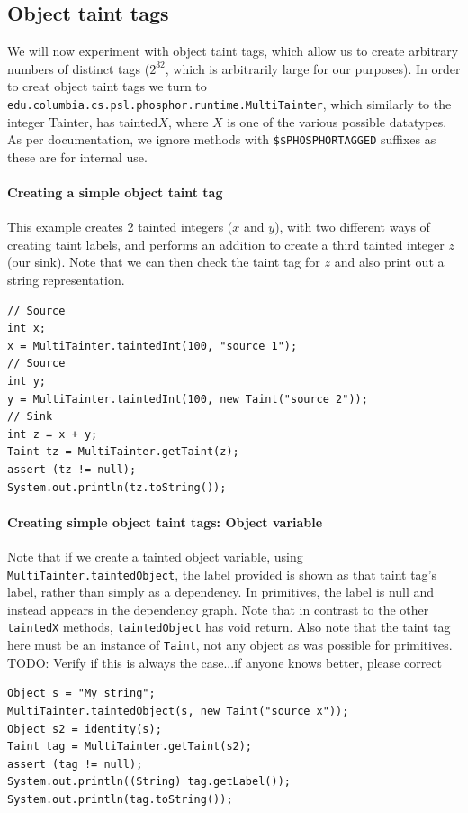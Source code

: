 \documentclass[a4paper]{article}
\newcommand{\todo}[1]{{\color{red}TODO: #1\\}}
\begin{document}
\subsection{Object taint tags}
\label{sec:multitaint}
We will now experiment with object taint tags, which allow us to create arbitrary numbers of distinct tags ($2^{32}$, which is arbitrarily large for our purposes). In order to creat object taint tags we turn to 
\verb|edu.columbia.cs.psl.phosphor.runtime.MultiTainter|, which similarly to the integer Tainter, has tainted$X$, where
$X$ is one of the various possible datatypes. As per documentation, we ignore methods
with \verb|$$PHOSPHORTAGGED| suffixes as these are for internal use.

\paragraph{Creating a simple object taint tag}
This example creates 2 tainted integers ($x$ and $y$), with two different ways of creating taint labels, and performs an addition
to create a third tainted integer $z$ (our sink). Note that we can then check the taint tag for $z$ and also print out
a string representation.

\begin{lstlisting}
// Source
int x;
x = MultiTainter.taintedInt(100, "source 1");
// Source
int y;
y = MultiTainter.taintedInt(100, new Taint("source 2"));
// Sink
int z = x + y;
Taint tz = MultiTainter.getTaint(z);
assert (tz != null);
System.out.println(tz.toString());
\end{lstlisting}

\paragraph{Creating simple object taint tags: Object variable}
Note that if we create a tainted object variable, using \verb|MultiTainter.taintedObject|, the label provided is
shown as that taint tag's label, rather than simply as a dependency. In primitives, the label is null and instead
appears in the dependency graph. Note that in contrast to the other \verb|taintedX| methods, \verb|taintedObject| has
void return. Also note that the taint tag here must be an instance of \verb|Taint|, not any object as was possible
for primitives.
\todo{Verify if this is always the case...if anyone knows better, please correct}

\begin{lstlisting}
Object s = "My string";
MultiTainter.taintedObject(s, new Taint("source x"));
Object s2 = identity(s);
Taint tag = MultiTainter.getTaint(s2);
assert (tag != null);
System.out.println((String) tag.getLabel());
System.out.println(tag.toString());
\end{lstlisting}
\end{document}
